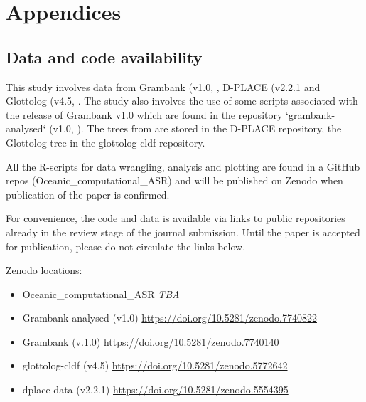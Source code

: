 \documentclass[12pt,letterpaper]{article}
\begin{document}

\newpage

\appendix
\section*{Appendices}
\renewcommand{\thesubsection}{\Alph{subsection}}

\subsection{Data and code availability}
\label{supp_data_availability}
This study involves data from Grambank (v1.0, \cite{grambank_release}, D-PLACE (v2.2.1 \citet{d_place_all} and Glottolog (v4.5, \citet{glottolog4_5}. The study also involves the use of some scripts associated with the release of Grambank v1.0 which are found in the repository `grambank-analysed` (v1.0, \citet{grambank_analysed_1_0}). The trees from \citet{grayetal_2009} are stored in the D-PLACE repository, the Glottolog tree in the glottolog-cldf repository.

All the R-scripts for data wrangling, analysis and plotting are found in a GitHub repos (Oceanic\_computational\_ASR) and will be published on Zenodo when publication of the paper is confirmed.

For convenience, the code and data is available via links to public repositories already in the review stage of the journal submission. Until the paper is accepted for publication, please do not circulate the links below.

Zenodo locations:

\begin{itemize}
\item Oceanic\_computational\_ASR \emph{TBA}
\item Grambank-analysed (v1.0) \url{https://doi.org/10.5281/zenodo.7740822}
\item Grambank (v.1.0) \url{https://doi.org/10.5281/zenodo.7740140}
\item glottolog-cldf (v4.5) \url{https://doi.org/10.5281/zenodo.5772642}
\item dplace-data (v2.2.1) \url{https://doi.org/10.5281/zenodo.5554395}
\end{itemize}
\end{document}
